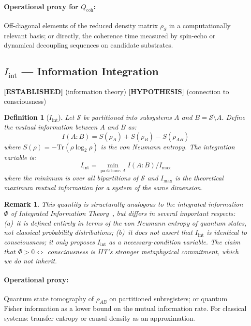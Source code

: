\documentclass[12pt,letterpaper]{article}
\newtheorem{definition}{Definition}[section]
\newtheorem{remark}{Remark}[section]
\newcommand{\ESTABLISHED}[1]{\textcolor{green!50!black}{\textbf{[ESTABLISHED]}} #1}
\newcommand{\HYPOTHESIS}[1]{\textcolor{blue!70!black}{\textbf{[HYPOTHESIS]}} #1}
\newcommand{\Qcoh}{Q_{\mathrm{coh}}}
\newcommand{\Iint}{I_{\mathrm{int}}}
\begin{document}
\paragraph{Operational proxy for $\Qcoh$:} Off-diagonal elements of the
reduced density matrix $\rho_\mathcal{S}$ in a computationally relevant basis;
or directly, the coherence time measured by spin-echo or dynamical decoupling
sequences on candidate substrates.

\subsection{\texorpdfstring{$\Iint$ — Information Integration}{Iint — Information Integration}}
\label{sec:Iint}

\ESTABLISHED{} (information theory) \HYPOTHESIS{} (connection to consciousness)

\begin{definition}[$\Iint$]
Let $\mathcal{S}$ be partitioned into subsystems $A$ and $B = \mathcal{S} \setminus A$.
Define the mutual information between $A$ and $B$ as:
\begin{equation}
  I(A:B) = S(\rho_A) + S(\rho_B) - S(\rho_{AB})
\end{equation}
where $S(\rho) = -\mathrm{Tr}(\rho \log_2 \rho)$ is the von Neumann entropy.
The integration variable is:
\begin{equation}
  \Iint = \min_{\text{partitions } A} I(A : B) \Big/ I_{\max}
  \label{eq:Iint}
\end{equation}
where the minimum is over all bipartitions of $\mathcal{S}$ and $I_{\max}$
is the theoretical maximum mutual information for a system of the same dimension.
\end{definition}

\begin{remark}
This quantity is structurally analogous to the integrated information $\Phi$
of Integrated Information Theory~\cite{Tononi2004}, but differs in several
important respects: (a)~it is defined entirely in terms of the von Neumann
entropy of quantum states, not classical probability distributions; (b)~it
does not assert that $\Iint$ is identical to consciousness; it only proposes
$\Iint$ as a necessary-condition variable. The claim that
$\Phi > 0 \Leftrightarrow$ consciousness is IIT's stronger metaphysical
commitment, which we do not inherit.
\end{remark}

\paragraph{Operational proxy:} Quantum state tomography of $\rho_{AB}$ on
partitioned subregisters; or quantum Fisher information as a lower bound on
the mutual information rate. For classical systems: transfer entropy or
causal density as an approximation.
\end{document}
